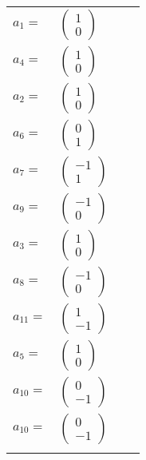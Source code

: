 \documentclass[1p]{elsarticle_modified}
\theoremstyle{definition}
\begin{document}
\begin{tabular}{m{7pt} m{180pt} m{7pt} m{180pt} }
\flushright $a_{1}=$&$\begin{pmatrix}1\\0\end{pmatrix}$ \\
\flushright $a_{4}=$&$\begin{pmatrix}1\\0\end{pmatrix}$ \\
\flushright $a_{2}=$&$\begin{pmatrix}1\\0\end{pmatrix}$ \\
\flushright $a_{6}=$&$\begin{pmatrix}0\\1\end{pmatrix}$ \\
\flushright $a_{7}=$&$\begin{pmatrix}-1\\1\end{pmatrix}$ \\
\flushright $a_{9}=$&$\begin{pmatrix}-1\\0\end{pmatrix}$ \\
\flushright $a_{3}=$&$\begin{pmatrix}1\\0\end{pmatrix}$ \\
\flushright $a_{8}=$&$\begin{pmatrix}-1\\0\end{pmatrix}$ \\
\flushright $a_{11}=$&$\begin{pmatrix}1\\-1\end{pmatrix}$ \\
\flushright $a_{5}=$&$\begin{pmatrix}1\\0\end{pmatrix}$ \\
\flushright $a_{10}=$&$\begin{pmatrix}0\\-1\end{pmatrix}$\\ \flushright $a_{10}=$&$\begin{pmatrix}0\\-1\end{pmatrix}$\\&\end{tabular}
\end{document}
